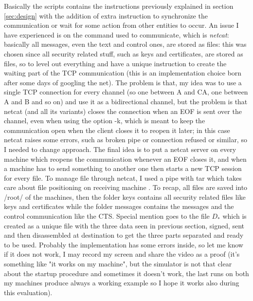 \documentclass{article}
\begin{document}
Basically the scripts contains the instructions previously explained in section \ref{sec:design} with the addition of extra instruction to synchronize the communication or wait for some action from other entities to occur. An issue I have experienced is on the command used to communicate, which is \textit{netcat}: basically all messages, even the text and control ones, are stored as files: this was chosen since all security related stuff, such as keys and certificates, are stored as files, so to level out everything and have a unique instruction to create the waiting part of the TCP communication (this is an implementation choice born after some days of googling the net). The problem is that, my idea was to use a single TCP connection for every channel (so one between A and CA, one between A and B and so on) and use it as a bidirectional channel, but the problem is that netcat (and all its variants) closes the connection when an EOF is sent over the channel, even when using the option -k, which is meant to keep the communication open when the client closes it to reopen it later; in this case netcat raises some errors, such as broken pipe or connection refused or similar, so I needed to change approach. The final idea is to put a netcat server on every machine which reopens the communication whenever an EOF closes it, and when a machine has to send something to another one then starts a new TCP session for every file. To manage file through netcat, I used a pipe with tar which takes care about file positioning on receiving machine \cite{nc_multiple}.\newline
To recap, all files are saved into /root/ of the machines, then the folder keys contains all security related files like keys and certificates while the folder messages contains the messages and the control communication like the CTS. Special mention goes to the file $D_*$ which is created as a unique file with the three data seen in previous section, signed, sent and then disassembled at destination to get the three parts separated and ready to be used.\newline
Probably the implementation has some errors inside, so let me know if it does not work, I may record my screen and share the video as a proof (it's something like "it works on my machine", but the simulator is not that clear about the startup procedure and sometimes it doesn't work, the last runs on both my machines produce always a working example so I hope it works also during this evaluation).

\end{document}

